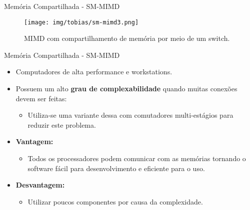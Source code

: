 \begin{frame}{Memória Compartilhada - SM-MIMD}
    \begin{figure}[h]
    	\centering
    	\texttt{[image: img/tobias/sm-mimd3.png]}
    	\caption{MIMD com compartilhamento de memória por meio de um switch.}
    	\label{fig:sm-mimd3}
    \end{figure}

\end{frame}


\begin{frame}{Memória Compartilhada - SM-MIMD}
	\begin{itemize}
		\item Computadores de alta performance e workstations.
		\item Possuem um alto \textbf{grau de complexabilidade} quando muitas conexões devem ser feitas:
		\begin{itemize}
		    \item Utiliza-se uma variante dessa com comutadores multi-estágios para reduzir este problema.
		\end{itemize}

						\bigskip
		\item \textbf{Vantagem:}
		\begin{itemize}
		    \item Todos os processadores podem comunicar com as memórias tornando o software fácil para desenvolvimento e eficiente para o uso.
		\end{itemize}

		\item \textbf{Desvantagem:}
		\begin{itemize}
		    \item Utilizar poucos componentes por causa da complexidade.
		\end{itemize}

	\end{itemize}

\end{frame}









